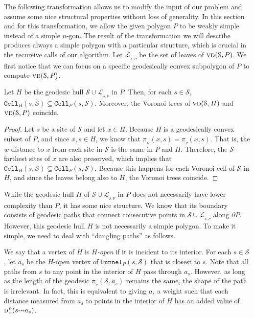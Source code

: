 \documentclass[a4paper,UKenglish]{socg-lipics-v2018}
\newcommand{\s}{\mathcal S}
\newcommand{\dd}[3][P]{\ensuremath{\textsc{d}_{\scriptscriptstyle w}^{\scriptscriptstyle #1}(#2 {\leadsto} #3)}}
\newcommand{\p}[3][P]{\ensuremath{\pi_{_{#1}}(#2, #3)}}
\newcommand{\funnel}[2][P]{\ensuremath{\mathtt{Funnel}_{\scriptscriptstyle #1}(#2)}}
\newcommand{\cell}[2][P]{\ensuremath{\mathtt{Cell}_{\scriptscriptstyle #1}(#2)}}
\newcommand{\vd}[2][P]{\textsc{vd}(#2, #1)}
\newcommand{\LL}[1][\s, P]{\ensuremath{\mathcal L_{_{#1}}}}
\begin{document}
The following transformation allows us to modify the input of our problem and assume some nice structural properties without loss of generality.
In this section and for this transformation, we allow the given polygon $P$ to be weakly simple instead of a simple $n$-gon. 
The result of the transformation we will describe produces always a simple polygon with a particular structure, which is crucial in the recursive calls of our algorithm.
Let $\LL$ be the set of leaves of $\vd{\s}$.
We first notice that we can focus on a specific geodesically convex subpolygon of $P$ to compute $\vd{\s}$.

\begin{lemma}\label{lemma:Voronoi coincides for geodesically convex subsets}
Let $H$ be the geodesic hull $\s\cup \LL$ in $P$.
Then, for each $s\in \s$, $\cell[H]{s, \s} \subseteq \cell{s, \s}$. Moreover, the Voronoi trees of $\vd[H]{\s}$ and $\vd{\s}$ coincide. 
\end{lemma}
\begin{proof}
Let $s$ be a site of $\s$ and let $x\in H$. 
Because $H$ is a geodesically convex subset of $P$, and since $x,s\in H$, we know that $\p[H]{x}{s} = \p{x}{s}$. 
That is, the $w$-distance to $x$ from each site in $\s$ is the same in $P$ and $H$. 
Therefore, the $\s$-farthest sites of $x$ are also preserved, which implies that $\cell[H]{s, \s} \subseteq \cell{s, \s}$. 
Because this happens for each Voronoi cell of $\s$ in $H$, and since the leaves belong also to $H$, the Voronoi trees coincide.
\end{proof}

While the geodesic hull $H$ of $\s\cup \LL$ in $P$ does not necessarily have lower complexity than $P$, it has some nice structure. 
We know that its boundary consists of geodesic paths that connect consecutive points in $\s\cup \LL$ along $\partial P$.
However, this geodesic hull $H$ is not necessarily a simple polygon. 
To make it simple, we need to deal with ``dangling paths'' as follows.

We say that a vertex of $H$ is \emph{$H$-open} if it is incident to its interior.
For each $s\in \s$, let $a_s$ be the $H$-open vertex of $\funnel{s, \s}$ that is closest to $s$. 
Note that all paths from $s$ to any point in the interior of $H$ pass through $a_s$.
However, as long as the length of the geodesic $\p{\s}{a_s}$ remains the same, the shape of the path is irrelevant. 
In fact, this is equivalent to giving $a_s$ a weight such that each distance measured from $a_s$ to points in the interior of $H$ has 
an added value of $\dd{s}{a_s}$. 
\end{document}
